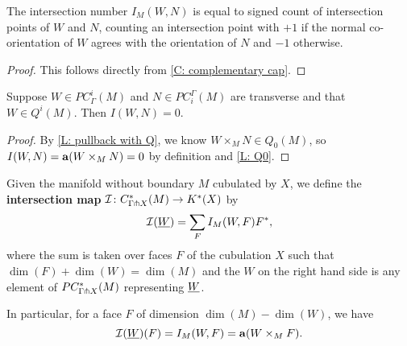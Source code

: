 \begin{lemma}\label{L: intersection number}
	The intersection number $I_M(W,N)$ is equal to signed count of intersection points of $W$ and $N$, counting an intersection point with $+1$ if the normal co-orientation of $W$ agrees with the orientation of $N$ and $-1$ otherwise.
\end{lemma}

\begin{proof}
	This follows directly from \cref{C: complementary cap}.
	\begin{comment}
		We first recall the construction of the pullback orientation $W \times_M N \to N$.
		As $W$ and $N$ are immersed near their geometric intersections, we can restrict to these immersed regions of $W$ and $N$ and so take the dimension of the Euclidean factor to be $0$ in Definition \ref{D: pullback coorient}.
		So then $\nu W$ is the oriented normal bundle of $W$ determined by the co-orientation in the immersed region, and we pull this back to be a normal bundle of $W \times_M N$ in $N$.
		In this simplified situation, Definition \ref{D: pullback coorient} tells us that the co-orientation of the pullback is the normal co-orientation corresponding to this pullback bundle, which is just the restriction of the normal bundle to the intersection point.
		So the co-orientation at each intersection point can be written as $(1,1 \wedge \beta_{\nu W}) = (1, \beta_{\nu W})$.
		So now by the discussion following Definition \ref{D: co-orientations}, we orient each point of the pullback by $1$ if $\beta_{\nu W}$ agrees with the orientation of $N$ and $-1$ otherwise.
		The lemma follows.
	\end{comment}
\end{proof}

\begin{lemma}\label{L: Q-trivial intersection}
	Suppose $W \in PC_\Gamma^i(M)$ and $N \in PC_{i}^\Gamma(M)$ are transverse and that $W \in Q^i(M)$.
	Then $I(W,N) = 0$.
\end{lemma}

\begin{proof}
	By \cref{L: pullback with Q}, we know $W \times_M N \in Q_0(M)$, so $I(W,N) = \mathbf{a}(W \times_M N) = 0$ by definition and \cref{L: Q0}.
\end{proof}

\begin{definition}\label{D: intersection homomorphism}
	Given the manifold without boundary $M$ cubulated by $X$, we define the \textbf{intersection map} $\mathcal{I} \colon C^*_{\Gamma \pitchfork X}(M) \to K^*(X)$ by $$\mathcal{I}(\underline{W}) = \sum_F I_M(W,F)F^*,$$ where the sum is taken over faces $F$ of the cubulation $X$ such that $\dim(F)+\dim(W) = \dim(M)$ and the $W$ on the right hand side is any element of $PC^*_{\Gamma \pitchfork X}(M)$ representing $\underline{W}$.

	In particular, for a face $F$ of dimension $\dim(M)-\dim(W)$, we have $$\mathcal{I}(\underline{W})(F) = I_M(W,F) = \mathbf{a}(W \times_M F).$$
\end{definition}

